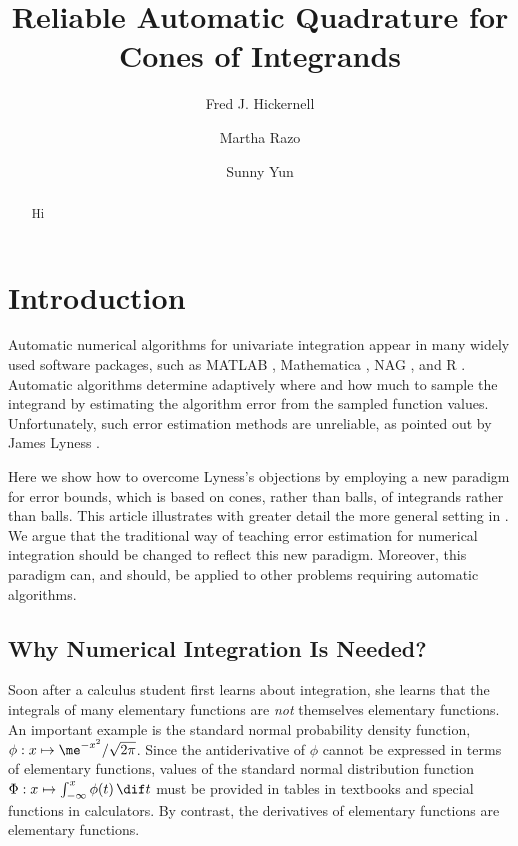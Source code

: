 \documentclass[]{amsart}
\theoremstyle{definition}
\theoremstyle{remark}
\begin{document}
\title{Reliable Automatic Quadrature for Cones of Integrands}
\author{Fred J. Hickernell}
\author{Martha Razo}
\author{Sunny Yun}
\maketitle 


\begin{abstract} Hi
\end{abstract}


\section{Introduction} 

Automatic numerical algorithms for univariate integration appear in many widely used software packages, such as MATLAB , Mathematica , NAG , and R .  Automatic algorithms determine adaptively where and how much to sample the integrand by estimating the algorithm error from the sampled function values.  Unfortunately, such error estimation methods are unreliable, as pointed out by James Lyness .

Here we show how to overcome Lyness's objections by employing a new paradigm for error bounds, which is based on cones, rather than balls, of integrands rather than balls.  This article illustrates with greater detail the more general setting in .  We argue that the traditional way of teaching error estimation for numerical integration should be changed to reflect this new paradigm.  Moreover, this paradigm can, and should, be applied to other problems requiring automatic algorithms. 

\subsection{Why Numerical Integration Is Needed?}
Soon after a calculus student first learns about integration, she learns that the integrals of many elementary functions are \emph{not} themselves elementary functions.  An important example is the standard normal probability density function, $\phi: x \mapsto \me^{-x^2}/\sqrt{2 \pi}$.  Since the antiderivative of $\phi$ cannot be expressed in terms of elementary functions, values of the standard normal distribution function $\Phi : x \mapsto \int_{-\infty}^x \phi(t) \, \dif t$ must be provided in tables in textbooks and special functions in calculators. By contrast, the derivatives of elementary functions are elementary functions.  
\end{document}
